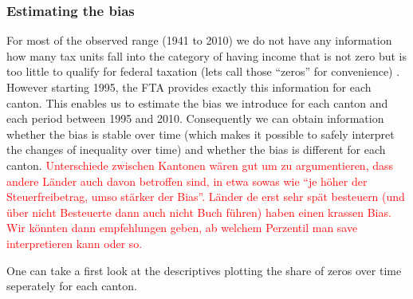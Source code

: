 \documentclass[twoside]{article}\usepackage[]{graphicx}\usepackage[]{color}
\begin{document}
\begin{multicols}{2}


\subsubsection{Estimating the bias}
For most of the observed range (1941 to 2010) we do not have any information how many tax units fall into the category of having income that is not zero but is too little to qualify for federal taxation (lets call those ``zeros'' for convenience) . However starting 1995, the FTA provides exactly this information for each canton. This enables us to estimate the bias we introduce for each canton and each period between 1995 and 2010. Consequently we can obtain information whether the bias is stable over time (which makes it possible to safely interpret the changes of inequality over time) and whether the bias is different for each canton. \textcolor{red}{Unterschiede zwischen Kantonen wären gut um zu argumentieren, dass andere Länder auch davon betroffen sind, in etwa sowas wie ``je höher der Steuerfreibetrag, umso stärker der Bias''. Länder de erst sehr spät besteuern (und über nicht Besteuerte dann auch nicht Buch führen) haben einen krassen Bias. Wir könnten dann empfehlungen geben, ab welchem Perzentil man save interpretieren kann oder so.}

One can take a first look at the descriptives plotting the share of zeros over time seperately for each canton.




\end{multicols}
\end{document}
